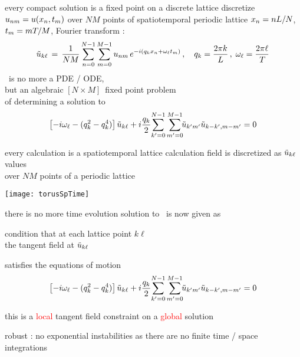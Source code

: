 \begin{frame}{every compact solution is a fixed point on a discrete lattice}
discretize $u_{nm} = u(x_n,t_m)$ over
$N M$ points of spatiotemporal periodic lattice $x_n = n L/N$,
 $t_m = m {T_{}}/M$, Fourier transform :
%
\[
\tilde{u}_{k\ell} \,=\,
  \frac{1}{NM} \sum^{N-1}_{n=0} \sum^{M-1}_{m=0}
  u_{nm} \, e^{-i(q_kx_n + \omega_\ell t_m)}
    \,,\quad
q_k = \frac{2 \pi k}{L}
    \,,\;
\omega_\ell = \frac{2 \pi \ell}{{T_{}}}
\]
\KS\ is no more a PDE / ODE, \\
but an algebraic $[N\!\times\!M]$\dmn\ fixed point problem \\
of determining a solution to
\[
\left[- i \omega_\ell - ( q_k^2 - q_k^4 ) \right]\tilde{u}_{k\ell}
+ i \frac{q_k}{2} \!\sum_{k'=0}^{N-1} \sum^{M-1}_{m'=0}\!\!
\tilde{u}_{k'm'} \tilde{u}_{k-k',m-m'}
    =
0
\]
\end{frame}

\begin{frame}{every calculation is a spatiotemporal lattice calculation}
field is discretized as
$\tilde{u}_{k\ell}$ values  \\ over
$N M$ points of a periodic lattice


\begin{center}
\texttt{[image: torusSpTime]}
\end{center}
\end{frame}


\begin{frame}{there is no more time evolution}
solution to \KS\ is now given as
\begin{block}{condition that}
at each lattice point $k\ell$ \\
the tangent field at $\tilde{u}_{k\ell}$
\end{block}
satisfies the equations of motion
\[
\left[- i \omega_\ell - ( q_k^2 - q_k^4 ) \right]\tilde{u}_{k\ell}
+ i \frac{q_k}{2} \!\sum_{k'=0}^{N-1} \sum^{M-1}_{m'=0}\!\!
\tilde{u}_{k'm'} \tilde{u}_{k-k',m-m'}
    =
0
\]

\bigskip

this is a \textcolor{red}{local} tangent field constraint on a \textcolor{red}{global} solution

\bigskip

robust : no exponential instabilities as there are no finite time / space integrations

\end{frame}

